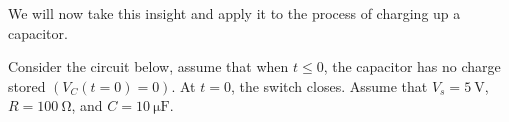 







We will now take this insight and apply it to the process of charging up a capacitor.
\newline

Consider the circuit below, assume that when $t\leq 0$, the capacitor has no charge stored $(V_{C}(t=0) = 0)$.
At $t=0$, the switch closes. Assume that $V_s=\SI{5}{\volt}$, $R=\SI{100}{\ohm}$, and $C=\SI{10}{\micro\farad}$.

